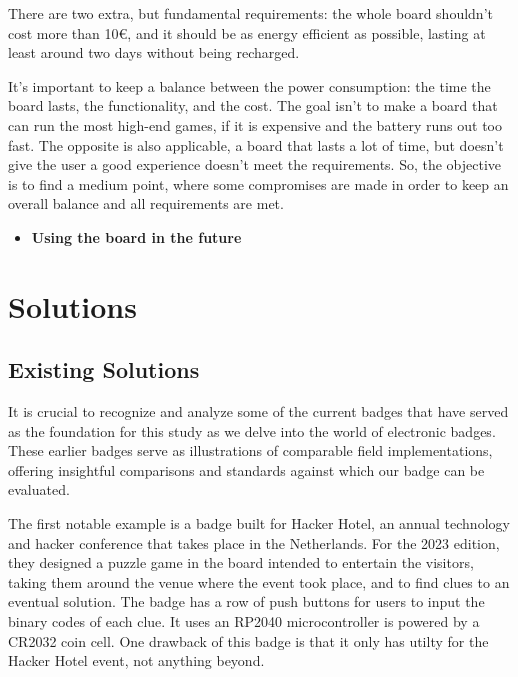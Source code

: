 \documentclass[english]{ist-thesis}
\begin{document}
There are two extra, but fundamental requirements: the whole board shouldn't cost more than 10€, and it should be as energy efficient as possible, lasting at least around two days without being recharged. 

It's important to keep a balance between the power consumption: the time the board lasts, the functionality, and the cost. The goal isn't to make a board that can run the most high-end games, if it is expensive and the battery runs out too fast. The opposite is also applicable, a board that lasts a lot of time, but doesn't give the user a good experience doesn't meet the requirements. So, the objective is to find a medium point, where some compromises are made in order to keep an overall balance and all requirements are met.  

\begin{itemize}
  \item \textbf{Using the board in the future}
\end{itemize}


\chapter{Solutions}

\section{Existing Solutions}

It is crucial to recognize and analyze some of the current badges that have served as the foundation for this study as we delve into the world of electronic badges. These earlier badges serve as illustrations of comparable field implementations, offering insightful comparisons and standards against which our badge can be evaluated. 

The first notable example is a badge built for Hacker Hotel, an annual technology and hacker conference that takes place in the Netherlands. For the 2023 edition, they designed a puzzle game in the board intended to entertain the visitors, taking them around the venue where the event took place, and to find clues to an eventual solution. The badge has a row of push buttons for users to input the binary codes of each clue. It uses an RP2040 microcontroller is powered by a CR2032 coin cell. One drawback of this badge is that it only has utilty for the Hacker Hotel event, not anything beyond. 
\end{document}
